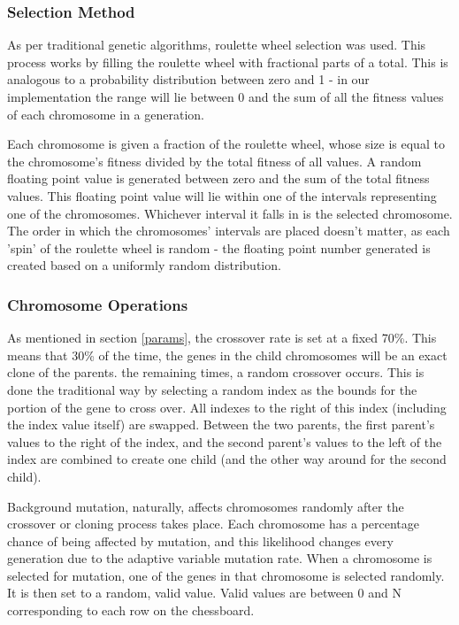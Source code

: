 \documentclass{sig-alternate}
\begin{document}
\subsubsection{Selection Method}
As per traditional genetic algorithms, roulette wheel selection was used. This process works by filling the roulette wheel with fractional parts of a total. This is analogous to a probability distribution between zero and 1 - in our implementation the range will lie between 0 and the sum of all the fitness values of each chromosome in a generation.

Each chromosome is given a fraction of the roulette wheel, whose size is equal to the chromosome's fitness divided by the total fitness of all values. A random floating point value is generated between zero and the sum of the total fitness values. This floating point value will lie within one of the intervals representing one of the chromosomes. Whichever interval it falls in is the selected chromosome. The order in which the chromosomes' intervals are placed doesn't matter, as each 'spin' of the roulette wheel is random - the floating point number generated is created based on a uniformly random distribution.

\subsubsection{Chromosome Operations}
As mentioned in section \ref{params}, the crossover rate is set at a fixed 70\%. This means that 30\% of the time, the genes in the child chromosomes will be an exact clone of the parents. the remaining times, a random crossover occurs. This is done the traditional way by selecting a random index as the bounds for the portion of the gene to cross over. All indexes to the right of this index (including the index value itself) are swapped. Between the two parents, the first parent's values to the right of the index, and the second parent's values to the left of the index are combined to create one child (and the other way around for the second child).

Background mutation, naturally, affects chromosomes randomly after the crossover or cloning process takes place. Each chromosome has a percentage chance of being affected by mutation, and this likelihood changes every generation due to the adaptive variable mutation rate. When a chromosome is selected for mutation, one of the genes in that chromosome is selected randomly. It is then set to a random, valid value. Valid values are between 0 and N corresponding to each row on the chessboard.
\end{document}
